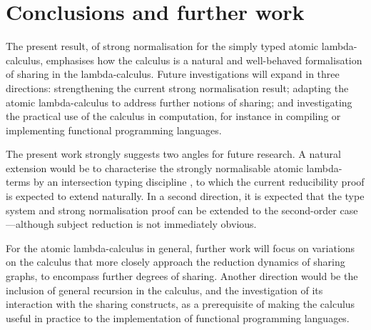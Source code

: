 \documentclass[orivec]{llncs}
\begin{document}
% 
\section{Conclusions and further work}



The present result, of strong normalisation for the simply typed atomic lambda-calculus, emphasises how the calculus is a natural and well-behaved formalisation of sharing in the lambda-calculus.
%
Future investigations will expand in three directions: strengthening the current strong normalisation result; adapting the atomic lambda-calculus to address further notions of sharing; and investigating the practical use of the calculus in computation, for instance in compiling or implementing functional programming languages.



The present work strongly suggests two angles for future research.
%
A natural extension would be to characterise the strongly normalisable atomic lambda-terms by an intersection typing discipline \cite{Coppo-DezaniCiancaglini-1980,Pottinger-1980,Krivine-1993}, to which the current reducibility proof is expected to extend naturally.
%
In a second direction, it is expected that the type system and strong normalisation proof can be extended to the second-order case---although subject reduction is not immediately obvious. %


For the atomic lambda-calculus in general, further work will focus on variations on the calculus that more closely approach the reduction dynamics of sharing graphs, to encompass further degrees of sharing.
%
Another direction would be the inclusion of general recursion in the calculus, and the investigation of its interaction with the sharing constructs, as a prerequisite of making the calculus useful in practice to the implementation of functional programming languages.






\newpage


\end{document}
